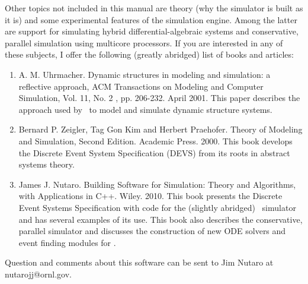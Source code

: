 Other topics not included in this manual are theory (why the simulator is built as it is) and some experimental features of the simulation engine. Among the latter are support for simulating hybrid differential-algebraic systems and conservative, parallel simulation using multicore processors. If you are interested in any of these subjects, I offer the following (greatly abridged) list of books and articles:
\begin{enumerate}
\item A. M. Uhrmacher. Dynamic structures in modeling and simulation: a reflective approach, ACM Transactions on Modeling and Computer Simulation, Vol. 11, No. 2 , pp. 206-232. April 2001. This paper describes the approach used by \adevs\ to model and simulate dynamic structure systems.
\item Bernard P. Zeigler, Tag Gon Kim and Herbert Praehofer. Theory of Modeling and Simulation, Second Edition. Academic Press. 2000. This book develops the Discrete Event System Specification (DEVS) from its roots in abstract systems theory.
\item James J. Nutaro. Building Software for Simulation: Theory and Algorithms, with Applications in C++. Wiley. 2010. This book presents the Discrete Event Systems Specification with code for the (slightly abridged) \adevs\ simulator and has several examples of its use. This book also describes the conservative, parallel simulator and discusses the construction of new ODE solvers and event finding modules for \adevs.
\end{enumerate}
Question and comments about this software can be sent to Jim Nutaro at nutarojj@ornl.gov. 
